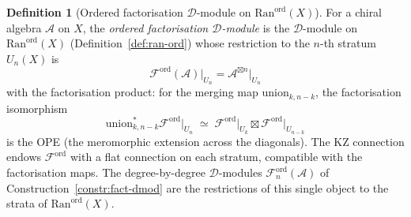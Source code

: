 \documentclass[11pt,reqno]{amsart}
\theoremstyle{definition}
\newtheorem{definition}[theorem]{Definition}
\theoremstyle{remark}
\newcommand{\cA}{\mathcal{A}}
\newcommand{\cD}{\mathcal{D}}
\newcommand{\cF}{\mathcal{F}}
\newcommand{\Ran}{\mathrm{Ran}}
\numberwithin{equation}{section}
\begin{document}
\begin{definition}[Ordered factorisation $\cD$-module
on $\Ran^{\mathrm{ord}}(X)$]
\label{def:fact-dmod-ran}
For a chiral algebra $\cA$ on $X$, the \emph{ordered
factorisation $\cD$-module} is the $\cD$-module on
$\Ran^{\mathrm{ord}}(X)$
(Definition~\ref{def:ran-ord}) whose restriction to the
$n$-th stratum $U_n(X)$ is
\[
  \cF^{\mathrm{ord}}(\cA)\big|_{U_n}
  = \cA^{\boxtimes n}\big|_{U_n}
\]
with the factorisation product: for the merging map
$\mathrm{union}_{k,n-k}$, the factorisation isomorphism
\[
  \mathrm{union}_{k,n-k}^* \cF^{\mathrm{ord}}\big|_{U_n}
  \;\simeq\;
  \cF^{\mathrm{ord}}\big|_{U_k}
  \boxtimes
  \cF^{\mathrm{ord}}\big|_{U_{n-k}}
\]
is the OPE (the meromorphic extension across the diagonals).
The KZ connection endows $\cF^{\mathrm{ord}}$ with a flat
connection on each stratum, compatible with the factorisation
maps. The degree-by-degree $\cD$-modules
$\cF_n^{\mathrm{ord}}(\cA)$ of
Construction~\ref{constr:fact-dmod} are the restrictions
of this single object to the strata of
$\Ran^{\mathrm{ord}}(X)$.
\end{definition}
\end{document}
